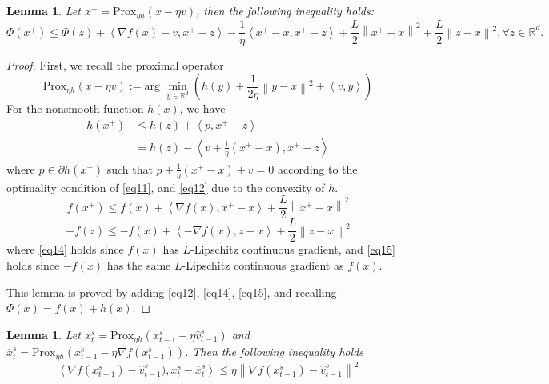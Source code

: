 \documentclass{article}
\newcommand*{\R}{\mathbb{R}}
\newcommand*{\Po}{\text{Prox}}
\newcommand{\norm}[1]{\left\lVert#1\right\rVert}
\newcommand{\Iprod}[2]{\left\langle #1,#2\right\rangle}
\newtheorem{lemma}[theorem]{Lemma}
\theoremstyle{definition}
\theoremstyle{remark}
\begin{document}
\begin{lemma}\label{lemma1}
Let $x^+ = \Po_{\eta h}(x-\eta v)$, then the following inequality holds:
\begin{equation}\label{eq10}
\Phi(x^+) \leq \Phi(z) + \Iprod{\nabla f(x)-v}{x^+-z}-\frac{1}{\eta} \Iprod{x^+-x}{x^+-z}+\frac{L}{2}\norm{x^+-x}^2+\frac{L}{2}\norm{z-x}^2, \forall z\in \R^d. 
\end{equation}
\end{lemma}
\begin{proof}
First, we recall the proximal operator 
\begin{equation}\label{eq11}
\Po_{\eta h}(x-\eta v) := \text{arg}\,\,\min_{y\in\R^d}\left(h(y)+\frac{1}{2\eta}\norm{y-x}^2+\Iprod{v}{y}\right)
\end{equation}
For the nonsmooth function $h(x)$, we have 
\begin{equation}\label{eq12}
\begin{split}
h(x^+) &\leq h(z) + \Iprod{p}{x^+-z}\\
&= h(z) - \Iprod{v+\frac{1}{\eta}(x^+-x)}{x^+-z}
\end{split}
\end{equation}
where $p\in \partial h(x^+)$ such that $p+\frac{1}{\eta}(x^+-x)+v = 0$ according to the optimality condition of \eqref{eq11}, and \eqref{eq12} due to the convexity of $h$.
\begin{equation}\label{eq14}
f(x^+) \leq f(x)+\Iprod{\nabla f(x)}{x^+-x}+\frac{L}{2}\norm{x^+-x}^2
\end{equation}
\begin{equation}\label{eq15}
-f(z) \leq -f(x)+\Iprod{-\nabla f(x)}{z-x}+\frac{L}{2}\norm{z-x}^2
\end{equation}
where \eqref{eq14} holds since $f(x)$ has $L$-Lipschitz continuous gradient, and \eqref{eq15} holds since $-f(x)$ has the same $L$-Lipschitz continuous gradient as $f(x)$. 

 This lemma is proved by adding \eqref{eq12}, \eqref{eq14}, \eqref{eq15}, and recalling $\Phi(x) = f(x)+h(x)$. 
\end{proof}
\begin{lemma}\label{lemm-est-grad}
Let  $x_{t}^s= \Po_{\eta h}(x_{t-1}^s - \eta \hat{v}_{t-1}^s)$ and $\overline{x}_{t}^s= \Po_{\eta h}(x_{t-1}^s - \eta \nabla f(x_{t-1}^s))$. Then the following inequality holds
\[
\Iprod{\nabla f(x_{t-1}^s) -\hat{v}_{t-1}^s)}{x_t^s -\overline{x}_t^s} \leq \eta\norm{\nabla f(x_{t-1}^s)-\hat{v}_{t-1}^s}^2
\]
\end{lemma}
\end{document}
